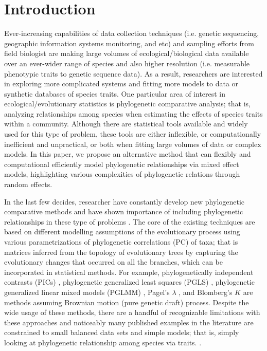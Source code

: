 \section{Introduction}

Ever-increasing capabilities of data collection techniques (i.e. genetic sequencing, geographic information systems monitoring, and etc) and sampling efforts from field biologist are making large volumes of ecological/biological data available over an ever-wider range of species and also higher resolution (i.e. measurable phenotypic traits to genetic sequence data). 
As a result, researchers are interested in exploring more complicated systems and fitting more models to data or synthetic databases of species traits.
One particular area of interest in ecological/evolutionary statistics is phylogenetic comparative analysis; that is, analyzing relationships among species when estimating the effects of species traits within a community. 
Although there are statistical tools available and widely used for this type of problem, these tools are either inflexible, or computationally inefficient and unpractical, or both when fitting large volumes of data or complex models.
In this paper, we propose an alternative method that can flexibly and computational efficiently model phylogenetic relationships via mixed effect models, highlighting various complexities of phylogenetic relations through random effects.  

In the last few decides, researcher have constantly develop new phylogenetic comparative methods and have shown importance of including phylogenetic relationships in these type of problems \cite{felsenstein1985phylogenies, li2017statistical}. 
The core of the existing techniques are based on different modelling assumptions of the evolutionary process using various parametrizations of phylogenetic correlations (PC) of taxa; that is matrices inferred from the topology of evolutionary trees by capturing the evolutionary changes that occurred on all the branches, which can be incorporated in statistical methods. 
For example, phylogenetically independent contrasts (PICs) \citep{felsenstein1985phylogenies}, phylogenetic generalized least squares (PGLS) \citep{grafen1989phylogenetic}, phylogenetic generalized linear mixed models (PGLMM) \citep{ives2011generalized}, Pagel's $\lambda$ \citep{pagel1999inferring}, and Blomberg's $K$ \citep{blomberg2003testing} are methods assuming Brownian motion (pure genetic draft) process. 
Despite the wide usage of these methods, there are a handful of recognizable limitations with these approaches and noticeably many published examples in the literature are constrained to small balanced data sets and simple models; that is, simply looking at phylogenetic relationship among species via traits. \citep{li2017canfun}.

